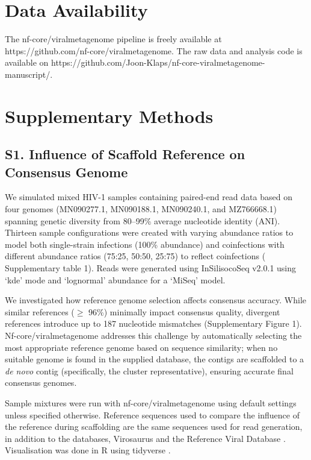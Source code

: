 
\section*{Data Availability}
The nf-core/viralmetagenome pipeline is freely available at https://github.com/nf-core/viralmetagenome.
The raw data and analysis code is available on https://github.com/Joon-Klaps/nf-core-viralmetagenome-manuscript/.

\section*{Supplementary Methods}
\subsection*{S1. Influence of Scaffold Reference on Consensus Genome}

We simulated mixed  HIV-1 samples containing paired-end read data based on four genomes (MN090277.1, MN090188.1, MN090240.1, and MZ766668.1) spanning genetic diversity from 80–99\% average nucleotide identity (ANI). Thirteen sample configurations were created with varying abundance ratios to model both single-strain infections (100\% abundance) and coinfections with different abundance ratios (75:25, 50:50, 25:75) to reflect coinfections ( Supplementary table 1). Reads were generated using InSilisocoSeq v2.0.1 \citep{Gourle2019-ox} using ‘kde’ mode and ‘lognormal’ abundance for a ‘MiSeq’ model.

We investigated how reference genome selection affects consensus accuracy. While similar references ($\geq$ 96\%) minimally impact consensus quality, divergent references introduce up to 187 nucleotide mismatches (Supplementary Figure 1). Nf-core/viralmetagenome addresses this challenge by automatically selecting the most appropriate reference genome based on sequence similarity; when no suitable genome is found in the supplied database, the contigs are scaffolded to a \textit{de novo} contig (specifically, the cluster representative), ensuring accurate final consensus genomes.

Sample mixtures were run with nf-core/viralmetagenome using default settings unless specified otherwise. Reference sequences used to compare the influence of the reference during scaffolding are the same sequences used for read generation, in addition to the databases, Virosaurus \citep{Gleizes2020-rq} and the Reference Viral Database \citep{Goodacre2018-dw}. Visualisation was done in R \citep{R_Core_Team2021-ow} using tidyverse \citep{Wickham2019-vr}.

